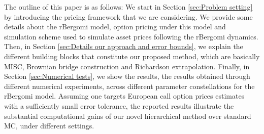 The outline of this paper is as follows: We start in Section \ref{sec:Problem setting} by  introducing  the pricing framework that we are considering. We provide some details about the rBergomi model, option pricing under this model and simulation scheme used to simulate asset prices following the rBergomi dynamics. Then, in Section \ref{sec:Details our approach and error bounds}, we explain the different building blocks that constitute our proposed method, which are basically MISC, Brownian bridge construction and Richardson extrapolation. Finally, in Section \ref{sec:Numerical tests}, we show the results, the results obtained through different numerical experiments, across different parameter constellations for the rBergomi model. Assuming one targets European call option prices estimates with a sufficiently small error tolerance, the reported results   illustrate the substantial computational gains of our novel hierarchical method over standard MC, under different settings. 


